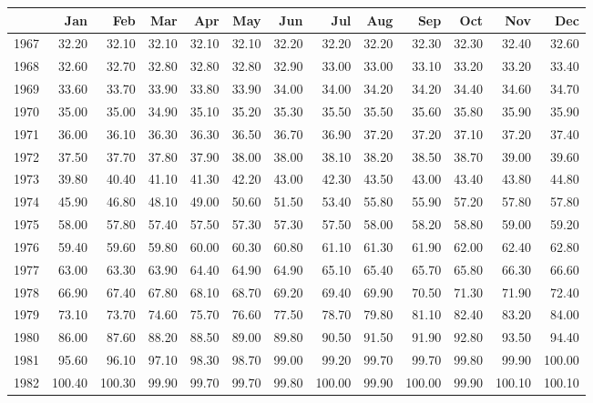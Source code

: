 \begin{longtable}{rrrrrrrrrrrrr}
  \hline
 & Jan & Feb & Mar & Apr & May & Jun & Jul & Aug & Sep & Oct & Nov & Dec \\ 
  \hline
1967 & 32.20 & 32.10 & 32.10 & 32.10 & 32.10 & 32.20 & 32.20 & 32.20 & 32.30 & 32.30 & 32.40 & 32.60 \\ 
  1968 & 32.60 & 32.70 & 32.80 & 32.80 & 32.80 & 32.90 & 33.00 & 33.00 & 33.10 & 33.20 & 33.20 & 33.40 \\ 
  1969 & 33.60 & 33.70 & 33.90 & 33.80 & 33.90 & 34.00 & 34.00 & 34.20 & 34.20 & 34.40 & 34.60 & 34.70 \\ 
  1970 & 35.00 & 35.00 & 34.90 & 35.10 & 35.20 & 35.30 & 35.50 & 35.50 & 35.60 & 35.80 & 35.90 & 35.90 \\ 
  1971 & 36.00 & 36.10 & 36.30 & 36.30 & 36.50 & 36.70 & 36.90 & 37.20 & 37.20 & 37.10 & 37.20 & 37.40 \\ 
  1972 & 37.50 & 37.70 & 37.80 & 37.90 & 38.00 & 38.00 & 38.10 & 38.20 & 38.50 & 38.70 & 39.00 & 39.60 \\ 
  1973 & 39.80 & 40.40 & 41.10 & 41.30 & 42.20 & 43.00 & 42.30 & 43.50 & 43.00 & 43.40 & 43.80 & 44.80 \\ 
  1974 & 45.90 & 46.80 & 48.10 & 49.00 & 50.60 & 51.50 & 53.40 & 55.80 & 55.90 & 57.20 & 57.80 & 57.80 \\ 
  1975 & 58.00 & 57.80 & 57.40 & 57.50 & 57.30 & 57.30 & 57.50 & 58.00 & 58.20 & 58.80 & 59.00 & 59.20 \\ 
  1976 & 59.40 & 59.60 & 59.80 & 60.00 & 60.30 & 60.80 & 61.10 & 61.30 & 61.90 & 62.00 & 62.40 & 62.80 \\ 
  1977 & 63.00 & 63.30 & 63.90 & 64.40 & 64.90 & 64.90 & 65.10 & 65.40 & 65.70 & 65.80 & 66.30 & 66.60 \\ 
  1978 & 66.90 & 67.40 & 67.80 & 68.10 & 68.70 & 69.20 & 69.40 & 69.90 & 70.50 & 71.30 & 71.90 & 72.40 \\ 
  1979 & 73.10 & 73.70 & 74.60 & 75.70 & 76.60 & 77.50 & 78.70 & 79.80 & 81.10 & 82.40 & 83.20 & 84.00 \\ 
  1980 & 86.00 & 87.60 & 88.20 & 88.50 & 89.00 & 89.80 & 90.50 & 91.50 & 91.90 & 92.80 & 93.50 & 94.40 \\ 
  1981 & 95.60 & 96.10 & 97.10 & 98.30 & 98.70 & 99.00 & 99.20 & 99.70 & 99.70 & 99.80 & 99.90 & 100.00 \\ 
  1982 & 100.40 & 100.30 & 99.90 & 99.70 & 99.70 & 99.80 & 100.00 & 99.90 & 100.00 & 99.90 & 100.10 & 100.10 \\ 

\end{longtable}

